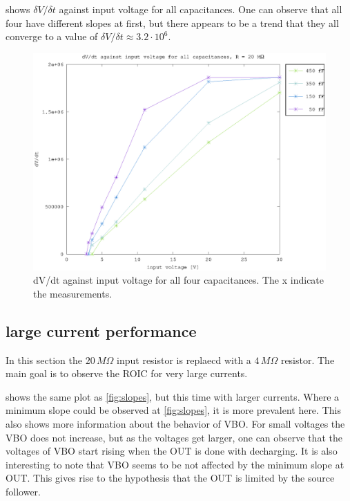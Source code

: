  shows $\delta V / \delta t$ against input voltage for all capacitances. One can observe that all four have different slopes at first, but there appears to be a trend that they all converge to a value of $\delta V/\delta t \approx 3.2\cdot10^6$.


\begin{figure}[h]
	    \centering
	    \includegraphics[width=\textwidth]{fig/vin_vs_time_sat.eps}
	    \caption[]%
	    {dV/dt against input voltage for all four capacitances. The x indicate the measurements.}    
	    \label{fig:e_vs_m}	
\end{figure}



\clearpage
\subsection{large current performance}
In this section the $20\,M\Omega$ input resistor is replaecd with a $4\,M\Omega$ resistor. The main goal is to observe the ROIC for very large currents.


 shows the same plot as \cref{fig:slopes}, but this time with larger currents. Where a minimum slope could be observed at \cref{fig:slopes}, it is more prevalent here. This also shows more information about the behavior of VBO. For small voltages the VBO does not increase, but as the voltages get larger, one can observe that the voltages of VBO start rising when the OUT is done with decharging. It is also interesting to note that VBO seems to be not affected by the minimum slope at OUT. This gives rise to the hypothesis that the OUT is limited by the source follower. 

